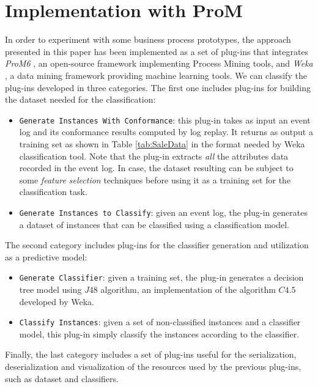 \documentclass{llncs}
\begin{document}
\section{Implementation with ProM}\label{implementation}
In order to experiment with some business process prototypes, the approach presented in this paper has been implemented as a set of plug-ins that integrates \emph{ProM6} \cite{DBLP:conf/bpm/AalstDGRVW09}, an open-source framework implementing Process Mining tools, and \emph{Weka} \cite{DBLP:journals/sigkdd/HallFHPRW09}, a data mining framework providing machine learning tools.
We can classify the plug-ins developed in three categories. The first one includes plug-ins for building the dataset needed for the classification:
\begin{itemize}
\item \texttt{Generate Instances With Conformance}: this plug-in takes as input an event log and its conformance results computed by log replay. It returns as output a training set as shown in Table \ref{tab:SaleData} in the format needed by Weka classification tool. Note that the plug-in extracts \emph{all} the attributes data recorded in the event log. In case, the dataset resulting can be subject to some \emph{feature selection} techniques before using it as a training set for the classification task.  

\item \texttt{Generate Instances to Classify}: given an event log, the plug-in generates a dataset of instances that can be classified using a classification model.
\end{itemize}
The second category includes plug-ins for the classifier generation and utilization as a predictive model:
\begin{itemize}
\item \texttt{Generate Classifier}: given a training set, the plug-in generates a decision tree model using $J48$ algorithm, an implementation of the algorithm $C4.5$ developed by Weka.
\item \texttt{Classify Instances}: given a set of non-classified instances and a classifier model, this plug-in simply classify the instances according to the classifier.
\end{itemize}
Finally, the last category includes a set of plug-ins useful for the serialization, deserialization and visualization of the resources used by the previous plug-ins, such as dataset and classifiers. 
\end{document}
